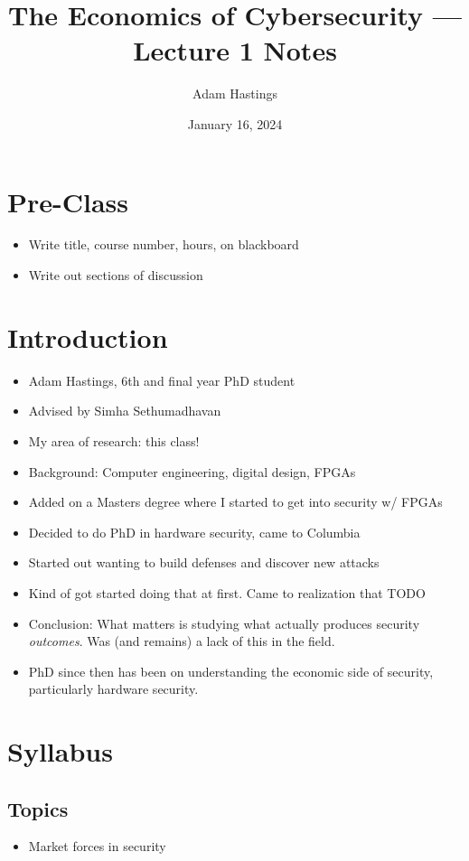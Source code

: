 \documentclass[11pt]{article}
\title{The Economics of Cybersecurity --- Lecture 1 Notes}
\date{January 16, 2024}
\author{Adam Hastings}
\begin{document}
\maketitle

\section*{Pre-Class}
\begin{itemize}
    \item Write title, course number, hours, on blackboard
    \item Write out sections of discussion
\end{itemize}

\section{Introduction}
\begin{itemize}
    \item Adam Hastings, 6th and final year PhD student
    \item Advised by Simha Sethumadhavan
    \item My area of research: this class! 
    \item Background: Computer engineering, digital design, FPGAs
    \item Added on a Masters degree where I started to get into security w/ FPGAs
    \item Decided to do PhD in hardware security, came to Columbia
    \item Started out wanting to build defenses and discover new attacks 
    \item Kind of got started doing that at first. Came to realization that TODO
    \item Conclusion: What matters is studying what actually produces security {\it outcomes}. Was (and remains) a lack of this in the field.
    \item PhD since then has been on understanding the economic side of security, particularly hardware security.
\end{itemize}


\section{Syllabus}



\subsection{Topics}
\begin{itemize}
    \item Market forces in security
\end{itemize}
\end{document}
